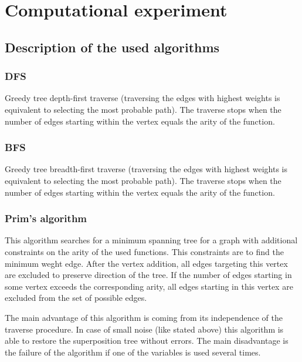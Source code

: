 \documentclass[11pt, tightenlines, twoside, onecolumn, nofloats, nobibnotes, nofootinbib, superscriptaddress, noshowpacks, centertags]{revtex4}
\begin{document}
\section{Computational experiment}
\subsection{Description of the used algorithms}
\subsubsection{DFS}
Greedy tree depth-first traverse (traversing the edges with highest weights is equivalent to selecting the most probable path). The traverse stops when the number of edges starting within the vertex equals the arity of the function.

\subsubsection{BFS}

Greedy tree breadth-first traverse (traversing the edges with highest weights is equivalent to selecting the most probable path). The traverse stops when the number of edges starting within the vertex equals the arity of the function.

\subsubsection{Prim's algorithm}

This algorithm searches for a minimum spanning tree for a graph with additional constraints on the arity of the used functions. This constraints are to find the minimum weght edge. After the vertex addition, all edges targeting this vertex are excluded to preserve direction of the tree. If the number of edges starting in some vertex exceeds the corresponding arity, all edges starting in this vertex are excluded from the set of possible edges.

The main advantage of this algorithm is coming from its independence of the traverse procedure. In case of small noise (like stated above) this algorithm is able to restore the superposition tree without errors. The main disadvantage is the failure of the algorithm if one of the variables is used several times.
\end{document}
